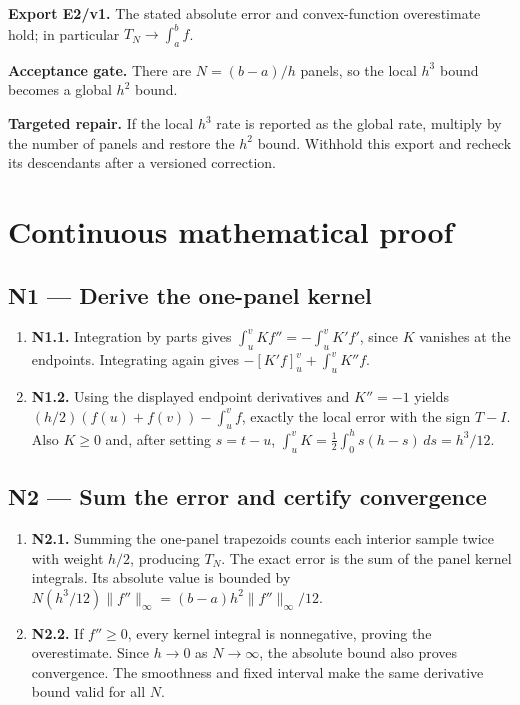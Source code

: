 \documentclass[preprint,12pt,aps,pra,showkeys,amsmath,amssymb,superscriptaddress,floatfix]{revtex4-2}
\theoremstyle{definition}
\theoremstyle{remark}
\newcommand{\field}[2]{\par\smallskip\noindent\textbf{#1.} #2\par}
\begin{document}
\field{Export E2/v1}{The stated absolute error and convex-function overestimate hold; in
particular \(T_N\to\int_a^b f\).}

\field{Acceptance gate}{There are \(N=(b-a)/h\) panels, so the local \(h^3\) bound becomes a
global \(h^2\) bound.}

\field{Targeted repair}{If the local \(h^3\) rate is reported as the global rate, multiply by
the number of panels and restore the \(h^2\) bound. Withhold this export
and recheck its descendants after a versioned correction.}

\endgroup\clearpage\section{Continuous mathematical proof}\label{sec:proof}

\subsection{N1 --- Derive the one-panel
kernel}\label{n1-derive-the-one-panel-kernel}

\begin{enumerate}
\def\labelenumi{\arabic{enumi}.}
\item
  \textbf{N1.1.} Integration by parts gives
  \(\int_u^v Kf''=-\int_u^v K'f'\), since \(K\) vanishes at the
  endpoints. Integrating again gives \(-[K'f]_u^v+\int_u^v K''f\).
\item
  \textbf{N1.2.} Using the displayed endpoint derivatives and \(K''=-1\)
  yields \((h/2)(f(u)+f(v))-\int_u^v f\), exactly the local error with
  the sign \(T-I\). Also \(K\ge0\) and, after setting \(s=t-u\),
  \(\int_u^v K=\frac12\int_0^h s(h-s)\,ds=h^3/12\).
\end{enumerate}

\subsection{N2 --- Sum the error and certify
convergence}\label{n2-sum-the-error-and-certify-convergence}

\begin{enumerate}
\def\labelenumi{\arabic{enumi}.}
\item
  \textbf{N2.1.} Summing the one-panel trapezoids counts each interior
  sample twice with weight \(h/2\), producing \(T_N\). The exact error
  is the sum of the panel kernel integrals. Its absolute value is
  bounded by \(N(h^3/12)\|f''\|_\infty=(b-a)h^2\|f''\|_\infty/12\).
\item
  \textbf{N2.2.} If \(f''\ge0\), every kernel integral is nonnegative,
  proving the overestimate. Since \(h\to0\) as \(N\to\infty\), the
  absolute bound also proves convergence. The smoothness and fixed
  interval make the same derivative bound valid for all \(N\).
\end{enumerate}
\end{document}
